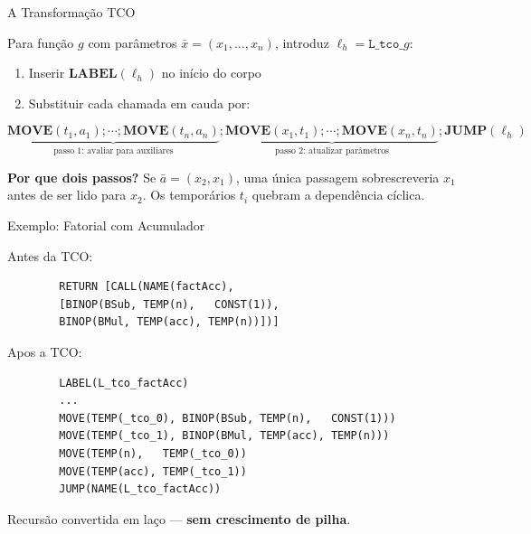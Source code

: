 \begin{frame}{A Transformação TCO}

    Para função \(g\) com parâmetros \(\bar{x} = (x_1,\ldots,x_n)\),
    introduz \(\ell_h = \mathtt{L\_tco\_}g\):

    \begin{enumerate}

        \item
        Inserir \(\mathbf{LABEL}(\ell_h)\) no início do corpo
        \item
        Substituir cada chamada em cauda por:
    \end{enumerate}

    \[\underbrace{\mathbf{MOVE}(t_1, a_1) \mathbin{;} \cdots \mathbin{;} \mathbf{MOVE}(t_n, a_n)}_{\text{passo 1: avaliar para auxiliares}} \mathbin{;} \underbrace{\mathbf{MOVE}(x_1, t_1) \mathbin{;} \cdots \mathbin{;} \mathbf{MOVE}(x_n, t_n)}_{\text{passo 2: atualizar parâmetros}} \mathbin{;} \mathbf{JUMP}(\ell_h)\]

    \textbf{Por que dois passos?} Se \(\bar{a} = (x_2, x_1)\), uma única
    passagem sobrescreveria \(x_1\) antes de ser lido para \(x_2\). Os
    temporários \(t_i\) quebram a dependência cíclica.
\end{frame}

\begin{frame}[fragile]{Exemplo: Fatorial com Acumulador}

    Antes da TCO:

    \begin{lstlisting}
        RETURN [CALL(NAME(factAcc),
        [BINOP(BSub, TEMP(n),   CONST(1)),
        BINOP(BMul, TEMP(acc), TEMP(n))])]
    \end{lstlisting}

    Apos a TCO:

    \begin{lstlisting}
        LABEL(L_tco_factAcc)
        ...
        MOVE(TEMP(_tco_0), BINOP(BSub, TEMP(n),   CONST(1)))
        MOVE(TEMP(_tco_1), BINOP(BMul, TEMP(acc), TEMP(n)))
        MOVE(TEMP(n),   TEMP(_tco_0))
        MOVE(TEMP(acc), TEMP(_tco_1))
        JUMP(NAME(L_tco_factAcc))
    \end{lstlisting}

    Recursão convertida em laço --- \textbf{sem crescimento de pilha}.
\end{frame}

